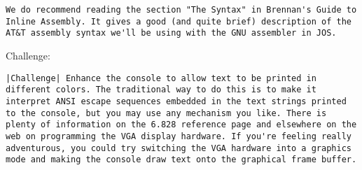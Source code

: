 \documentclass{article}
\begin{document}
\begin{CJK*}{UTF8}{gkai}
\begin{lstlisting}[style=exercise]
We do recommend reading the section "The Syntax" in Brennan's Guide to Inline Assembly. It gives a good (and quite brief) description of the AT&T assembly syntax we'll be using with the GNU assembler in JOS.
\end{lstlisting}

Challenge:
\begin{lstlisting}[style=challenge]
|Challenge| Enhance the console to allow text to be printed in different colors. The traditional way to do this is to make it interpret ANSI escape sequences embedded in the text strings printed to the console, but you may use any mechanism you like. There is plenty of information on the 6.828 reference page and elsewhere on the web on programming the VGA display hardware. If you're feeling really adventurous, you could try switching the VGA hardware into a graphics mode and making the console draw text onto the graphical frame buffer.
\end{lstlisting}
\clearpage

\end{CJK*}
\end{document}
